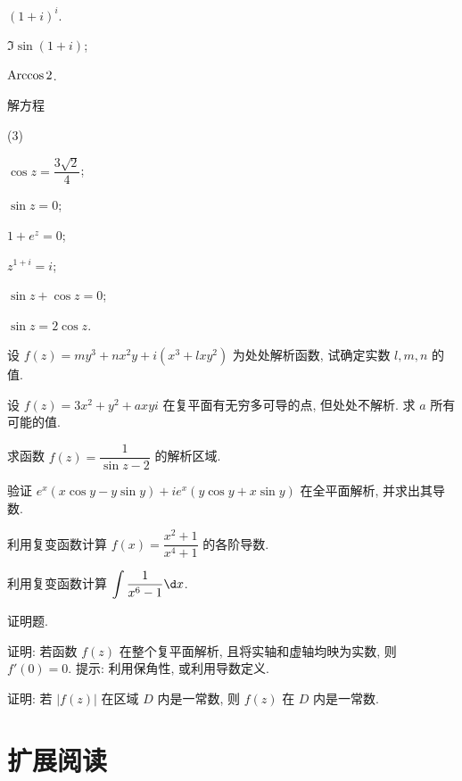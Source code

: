 \begin{homework}
\begin{subex}
\begin{subsubex}
        \item $(1+i)^i$.
        \item $\Im\sin(1+i)$;
        \item $\operatorname{Arccos} 2$.
      \end{subsubex}
    \item 解方程 
      \begin{subsubex}(3)
        \item $\cos z=\dfrac{3\sqrt2}4$;
        \item $\sin z=0$;
        \item $1+e^z=0$;
        \item $z^{1+i}=i$;
        \item $\sin z+\cos z=0$;
        \item $\sin z=2\cos z$.
      \end{subsubex}
    \item 设 $f(z)=my^3+nx^2y+i(x^3+lxy^2)$ 为处处解析函数, 试确定实数 $l,m,n$ 的值.
    \item 设 $f(z)=3x^2+y^2+axyi$ 在复平面有无穷多可导的点, 但处处不解析. 求 $a$ 所有可能的值.
    \item 求函数 $f(z)=\dfrac{1}{\sin z-2}$ 的解析区域.
    \item 验证 $e^x(x\cos y-y\sin y)+i e^x(y\cos y+x\sin y)$ 在全平面解析, 并求出其导数.
    \item 利用复变函数计算 $f(x)=\dfrac{x^2+1}{x^4+1}$ 的各阶导数.
    \item 利用复变函数计算 $\displaystyle\int\frac{1}{x^6-1}\d x$.
  \end{subex}
  \item 证明题.
  \begin{subex}
    \item 证明: 若函数 $f(z)$ 在整个复平面解析, 且将实轴和虚轴均映为实数, 则 $f'(0)=0$. 
    提示: 利用保角性, 或利用导数定义.
    \item 证明: 若 $|f(z)|$ 在区域 $D$ 内是一常数, 则 $f(z)$ 在 $D$ 内是一常数.
  \end{subex}
\end{homework}
  

\newpage
\section{扩展阅读\optional}

